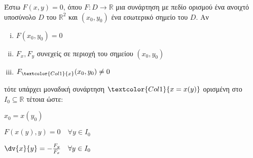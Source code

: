 Έστω $ F(x,y) = 0 $, όπου $ F\colon D \to \mathbb{R} $ μια συνάρτηση με πεδίο
ορισμού ένα ανοιχτό υποσύνολο $D$ του $\mathbb{R}^{2}$ και $ (x_0,y_0) $ ένα 
εσωτερικό σημείο του $D$.  Αν 
\begin{enumerate}[(i)]
  \item $F(x_0,y_0) = 0$ 
  \item $ F_x, F_y$ συνεχείς σε περιοχή του σημείου $ (x_0,y_0) $ 
  \item $ F_{\textcolor{Col1}{x}}(x_0,y_0) \neq 0 $
\end{enumerate}
τότε υπάρχει μοναδική συνάρτηση $ \textcolor{Col1}{x=x(y)} $ ορισμένη στο $ I_0 \subseteq \mathbb{R} $ 
τέτοια ώστε:
\begin{myitemize}
  \item $x_0 = x(y_0)$
  \item $F(x(y),y) = 0 \quad \forall y \in I_0$
  \item $ \dv{x}{y} = - \frac{F_y}{F_x} \quad \forall y \in I_0  $
\end{myitemize}

